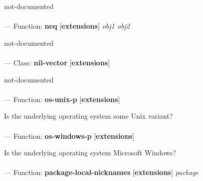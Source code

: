 \begin{adjustwidth}{5em}{5em}
not-documented
\end{adjustwidth}

\paragraph{}
\label{EXTENSIONS:NEQ}
--- Function: \textbf{neq} [\textbf{extensions}] \textit{obj1 obj2}

\begin{adjustwidth}{5em}{5em}
not-documented
\end{adjustwidth}

\paragraph{}
\label{EXTENSIONS:NIL-VECTOR}
--- Class: \textbf{nil-vector} [\textbf{extensions}] \textit{}

\begin{adjustwidth}{5em}{5em}
not-documented
\end{adjustwidth}

\paragraph{}
\label{EXTENSIONS:OS-UNIX-P}
--- Function: \textbf{os-unix-p} [\textbf{extensions}] \textit{}

\begin{adjustwidth}{5em}{5em}
Is the underlying operating system some Unix variant?
\end{adjustwidth}

\paragraph{}
\label{EXTENSIONS:OS-WINDOWS-P}
--- Function: \textbf{os-windows-p} [\textbf{extensions}] \textit{}

\begin{adjustwidth}{5em}{5em}
Is the underlying operating system Microsoft Windows?
\end{adjustwidth}

\paragraph{}
\label{EXTENSIONS:PACKAGE-LOCAL-NICKNAMES}
--- Function: \textbf{package-local-nicknames} [\textbf{extensions}] \textit{package}

